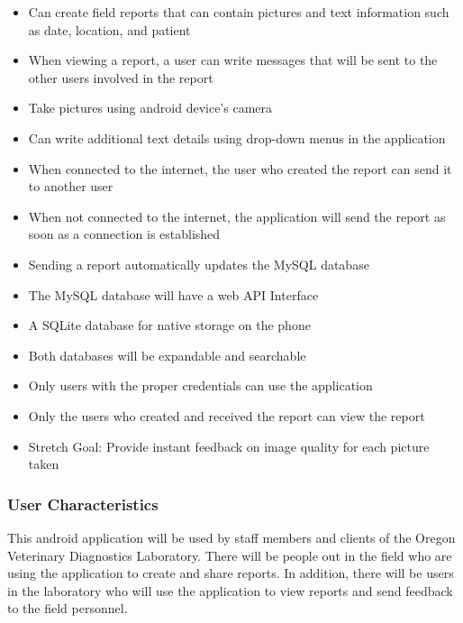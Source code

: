 \documentclass[onecolumn, draftclsnofoot,10pt, compsoc]{IEEEtran}
\begin{document}
\begin{itemize}

\item Can create field reports that can contain pictures and text information such as date, location, and patient

\item When viewing a report, a user can write messages that will be sent to the other users involved in the report

\item Take pictures using android device's camera

\item Can write additional text details using drop-down menus in the application 

\item When connected to the internet, the user who created the report can send it to another user

\item When not connected to the internet, the application will send the report as soon as a connection is established

\item Sending a report automatically updates the MySQL database

\item The MySQL database will have a web API Interface

\item A SQLite database for native storage on the phone

\item Both databases will be expandable and searchable

\item Only users with the proper credentials can use the application

\item Only the users who created and received the report can view the report

\item Stretch Goal: Provide instant feedback on image quality for each picture taken

\end{itemize}

\subsubsection{User Characteristics}
This android application will be used by staff members and clients of the Oregon Veterinary Diagnostics Laboratory. 
There will be people out in the field who are using the application to create and share reports. 
In addition, there will be users in the laboratory who will use the application to view reports and send feedback to the field personnel.
\end{document}
